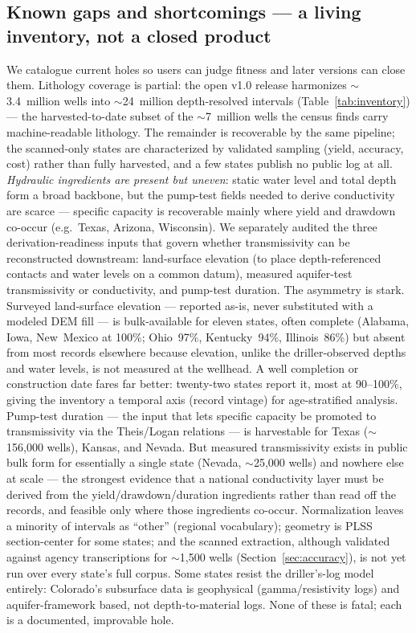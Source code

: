 \documentclass[12pt]{article}
\begin{document}
\subsection{Known gaps and shortcomings --- a living inventory, not a closed product}
\label{sec:gaps}
We catalogue current holes so users can judge fitness and later versions can close them.
Lithology coverage is partial: the open v1.0 release harmonizes $\sim$3.4~million wells into
$\sim$24~million depth-resolved intervals (Table~\ref{tab:inventory}) --- the harvested-to-date subset of
the $\sim$7~million wells the census finds carry machine-readable lithology. The remainder is recoverable by
the same pipeline; the scanned-only states are characterized by validated sampling (yield, accuracy, cost)
rather than fully harvested, and a few states publish no public log at all. \emph{Hydraulic ingredients are present but
uneven}: static water level and total depth form a broad backbone, but the pump-test fields needed to
derive conductivity are scarce --- specific capacity is recoverable mainly where yield and drawdown
co-occur (e.g.\ Texas, Arizona, Wisconsin). We separately audited the three derivation-readiness
inputs that govern whether transmissivity can be reconstructed downstream: land-surface elevation (to place
depth-referenced contacts and water levels on a common datum), measured aquifer-test transmissivity
or conductivity, and pump-test duration. The asymmetry is stark. Surveyed land-surface elevation --- reported
as-is, never substituted with a modeled DEM fill --- is bulk-available for eleven states, often complete
(Alabama, Iowa, New~Mexico at 100\%; Ohio~97\%, Kentucky~94\%, Illinois~86\%) but absent from most records
elsewhere because elevation, unlike the driller-observed depths and water levels, is not measured at the
wellhead. A well completion or construction date fares far better: twenty-two states report it, most
at 90--100\%, giving the inventory a temporal axis (record vintage) for age-stratified analysis. Pump-test duration --- the input that lets specific capacity be promoted to transmissivity
via the Theis/Logan relations --- is harvestable for Texas ($\sim$156{,}000 wells), Kansas, and Nevada.
But measured transmissivity exists in public bulk form for essentially a single state (Nevada,
$\sim$25{,}000 wells) and nowhere else at scale --- the strongest evidence that a national conductivity
layer must be derived from the yield/drawdown/duration ingredients rather than read off the records,
and feasible only where those ingredients co-occur. Normalization leaves a
minority of intervals as ``other'' (regional vocabulary); geometry is PLSS section-center for some
states; and the scanned extraction, although validated against agency transcriptions for $\sim$1{,}500
wells (Section~\ref{sec:accuracy}), is not yet run over every state's full corpus. Some states resist the
driller's-log model entirely: Colorado's subsurface data is geophysical (gamma/resistivity logs) and
aquifer-framework based, not depth-to-material logs. None of these is fatal; each is a documented,
improvable hole.
\end{document}
